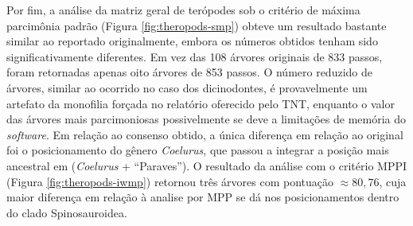 \documentclass[12pt]{article}
\begin{document}
Por fim, a análise da matriz geral de terópodes sob o critério de máxima parcimônia padrão (Figura \ref{fig:theropods-smp}) obteve um resultado bastante similar ao reportado originalmente, embora os números obtidos tenham sido significativamente diferentes. Em vez das 108 árvores originais de 833 passos, foram retornadas apenas oito árvores de 853 passos. O número reduzido de árvores, similar ao ocorrido no caso dos dicinodontes, é provavelmente um artefato da monofilia forçada no relatório oferecido pelo TNT, enquanto o valor das árvores mais parcimoniosas possivelmente se deve a limitações de memória do \emph{software}. Em relação ao consenso obtido, a única diferença em relação ao original foi o posicionamento do gênero \emph{Coelurus}, que passou a integrar a posição mais ancestral em (\emph{Coelurus} + ``Paraves''). O resultado da análise com o critério MPPI (Figura \ref{fig:theropods-iwmp}) retornou três árvores com pontuação $\approx 80,76$, cuja maior diferença em relação à analise por MPP se dá nos posicionamentos dentro do clado Spinosauroidea. 
\end{document}
